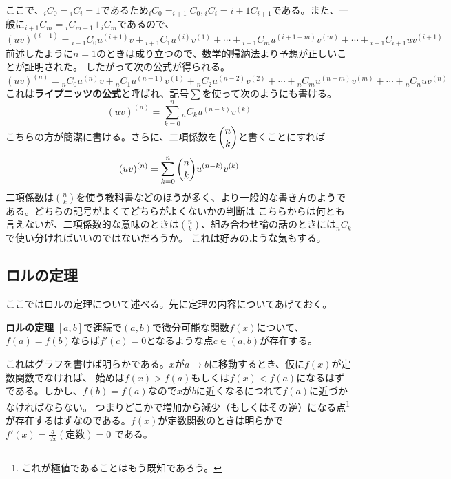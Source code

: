\documentclass[a4j,dvipdfmx]{jsarticle}
\begin{document}
                    ここで、${}_iC_0={}_iC_i=1$であるため${}_iC_0=_{i+1}C_0,{}_iC_i={i+1}C_{i+1}$である。また、一般に${}_{i+1}C_m={}_iC_{m-1}+_iC_m$であるので、
                    \begin{equation*}
                        (uv)^{(i+1)}={}_{i+1}C_0u^{(i+1)}v+{}_{i+1}C_1u^{(i)}v^{(1)}+\cdots+{}_{i+1}C_{m}u^{(i+1-m)}v^{(m)}+\cdots+{}_{i+1}C_{i+1}uv^{(i+1)}                    
                    \end{equation*}
                    前述したように$n=1$のときは成り立つので、数学的帰納法より予想が正しいことが証明された。
                    \clearpage
                    したがって次の公式が得られる。
                    \begin{equation}
                        (uv)^{(n)}={}_nC_0u^{(n)}v+{}_nC_1u^{(n-1)}v^{(1)}+{}_nC_2u^{(n-2)}v^{(2)}+\cdots + {}_nC_mu^{(n-m)}v^{(m)}+\cdots+{}_nC_nuv^{(n)}\label{eq:ライプニッツの公式}
                    \end{equation}
                    これは\textbf{ライプニッツの公式}と呼ばれ、記号$\sum$を使って次のようにも書ける。
                    \begin{equation}
                        (uv)^{(n)}=\sum_{k=0}^{n} {_nC_k}u^{(n-k)}v^{(k)}
                    \end{equation}
                    こちらの方が簡潔に書ける。さらに、二項係数を$\dbinom{n}{k}$と書くことにすれば
                    \begin{equation}
                        (uv)^{(n)}=\sum_{k=0}^{n} \dbinom{n}{k}u^{(n-k)}v^{(k)}
                    \end{equation}
                    二項係数は$\binom{n}{k}$を使う教科書などのほうが多く、より一般的な書き方のようである。どちらの記号がよくてどちらがよくないかの判断は
                    こちらからは何とも言えないが、二項係数的な意味のときは$\binom{n}{k}$、組み合わせ論の話のときには$_nC_k$で使い分ければいいのではないだろうか。
                    これは好みのような気もする。
                \clearpage
                \subsection{ロルの定理}
                    ここではロルの定理について述べる。先に定理の内容についてあげておく。
                    \begin{itembox}{\textbf{ロルの定理}}
                        $[a,b]$で連続で$(a,b)$で微分可能な関数$f(x)$について、$f(a)=f(b)$ならば$f'(c)=0$となるような点$c\in(a,b)$が存在する。
                    \end{itembox}
                    これはグラフを書けば明らかである。$x$が$a\to b$に移動するとき、仮に$f(x)$が定数関数でなければ、
                    始めは$f(x)>f(a)$もしくは$f(x)<f(a)$になるはずである。しかし、$f(b)=f(a)$なので$x$が$b$に近くなるにつれて$f(a)$に近づかなければならない。
                    つまりどこかで増加から減少（もしくはその逆）になる点\footnote{これが極値であることはもう既知であろう。}が存在するはずなのである。$f(x)$が定数関数のときは明らかで$f'(x)=\frac{d}{dx}(\text{定数})=0$
                    である。
\end{document}
